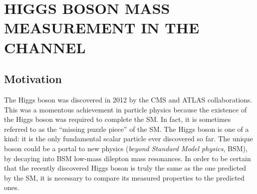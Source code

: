 \chapter{HIGGS BOSON MASS MEASUREMENT IN THE \texorpdfstring{\hzzfourl}{H to ZZ to 4l} CHANNEL}
\label{ch:higgs_mass}
\section{Motivation}
The Higgs boson was discovered in 2012 by the CMS and ATLAS collaborations.
This was a momentous achievement in particle physics because the existence of the Higgs boson was required to complete the SM.
In fact, it is sometimes referred to as the ``missing puzzle piece'' of the SM.
The Higgs boson is one of a kind: it is the only fundamental scalar particle ever discovered so far.
The unique boson could be a portal to new physics (\emph{beyond Standard Model physics}, BSM), \eg by decaying into BSM low-mass dilepton mass resonances.
In order to be certain that the recently discovered Higgs boson is truly the same as the one predicted by the SM, it is necessary to compare its measured properties to the predicted ones.




